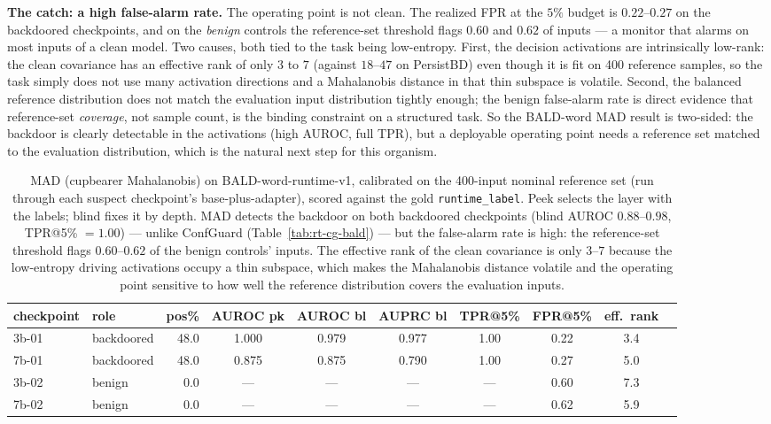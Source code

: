 \documentclass[11pt]{article}
\begin{document}
\textbf{The catch: a high false-alarm rate.} The operating point is not clean. The realized FPR at
the $5\%$ budget is $0.22$--$0.27$ on the backdoored checkpoints, and on the \emph{benign} controls
the reference-set threshold flags $0.60$ and $0.62$ of inputs --- a monitor that alarms on most
inputs of a clean model. Two causes, both tied to the task being low-entropy. First, the decision
activations are intrinsically low-rank: the clean covariance has an effective rank of only $3$ to
$7$ (against $18$--$47$ on PersistBD) even though it is fit on 400 reference samples, so the task
simply does not use many activation directions and a Mahalanobis distance in that thin subspace is
volatile. Second, the balanced reference distribution does not match the evaluation input
distribution tightly enough; the benign false-alarm rate is direct evidence that reference-set
\emph{coverage}, not sample count, is the binding constraint on a structured task. So the BALD-word
MAD result is two-sided: the backdoor is clearly detectable in the activations (high AUROC, full
TPR), but a deployable operating point needs a reference set matched to the evaluation distribution,
which is the natural next step for this organism.

\begin{table}[H]
\centering
\small
\begin{tabular}{llrccccccr}
\toprule
checkpoint & role & pos\% & AUROC pk & AUROC bl & AUPRC bl & TPR@5\% & FPR@5\% & eff.\ rank \\
\midrule
3b-01 & backdoored & 48.0 & 1.000 & 0.979 & 0.977 & 1.00 & 0.22 & 3.4 \\
7b-01 & backdoored & 48.0 & 0.875 & 0.875 & 0.790 & 1.00 & 0.27 & 5.0 \\
3b-02 & benign     &  0.0 & ---   & ---   & ---   & ---  & 0.60 & 7.3 \\
7b-02 & benign     &  0.0 & ---   & ---   & ---   & ---  & 0.62 & 5.9 \\
\bottomrule
\end{tabular}
\caption{MAD (cupbearer Mahalanobis) on BALD-word-runtime-v1, calibrated on the 400-input nominal
reference set (run through each suspect checkpoint's base-plus-adapter), scored against the gold
\texttt{runtime\_label}. Peek selects the layer with the labels; blind fixes it by depth. MAD
detects the backdoor on both backdoored checkpoints (blind AUROC $0.88$--$0.98$, TPR@5\% $=1.00$)
--- unlike ConfGuard (Table~\ref{tab:rt-cg-bald}) --- but the false-alarm rate is high: the
reference-set threshold flags $0.60$--$0.62$ of the benign controls' inputs. The effective rank of
the clean covariance is only $3$--$7$ because the low-entropy driving activations occupy a thin
subspace, which makes the Mahalanobis distance volatile and the operating point sensitive to how
well the reference distribution covers the evaluation inputs.}
\label{tab:rt-mad-bald}
\end{table}
\end{document}
